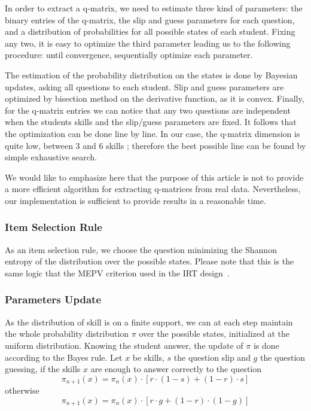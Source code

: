 \documentclass{sig-alternate}
\begin{document}
In order to extract a q-matrix, we need to estimate three kind of parameters: the binary entries of the q-matrix, the slip and guess parameters for each question, and a distribution of probabilities for all possible states of each student. Fixing any two, it is easy to optimize the third parameter leading us to the following procedure: until convergence, sequentially optimize each parameter.

The estimation of the probability distribution on the states is done by Bayesian updates, asking all questions to each student. Slip and guess parameters are optimized by bisection method on the derivative function, as it is convex. Finally, for the q-matrix entries we can notice that any two questions are independent when the students skills and the slip/guess parameters are fixed. It follows that the optimization can be done line by line. In our case, the q-matrix dimension is quite low, between 3 and 6 skills ; therefore the best possible line can be found by simple exhaustive search.

We would like to emphasize here that the purpose of this article is not to provide a more efficient algorithm for extracting q-matrices from real data. Nevertheless, our implementation is sufficient to provide results in a reasonable time. %

\subsubsection{Item Selection Rule}

As an item selection rule, we choose the question minimizing the Shannon entropy of the distribution over the possible states. Please note that this is the same logic that the MEPV criterion used in the IRT design~\citep{Cheng2009}.

\subsubsection{Parameters Update}

As the distribution of skill is on a finite support, we can at each step maintain the whole probability distribution $\pi$ over the possible states, initialized at the uniform distribution.
Knowing the student answer, the update of $\pi$ is done according to the Bayes rule. Let $x$ be skills, $s$ the question slip and $g$ the question guessing, if the skills $x$ are enough to answer correctly to the question
\[ \pi_{n+1}(x) = \pi_n(x) \cdot [r\cdot(1-s) + (1-r)\cdot s] \]
otherwise
\[ \pi_{n+1}(x) = \pi_n(x) \cdot [r\cdot g + (1-r)\cdot(1-g)] \]
\end{document}
